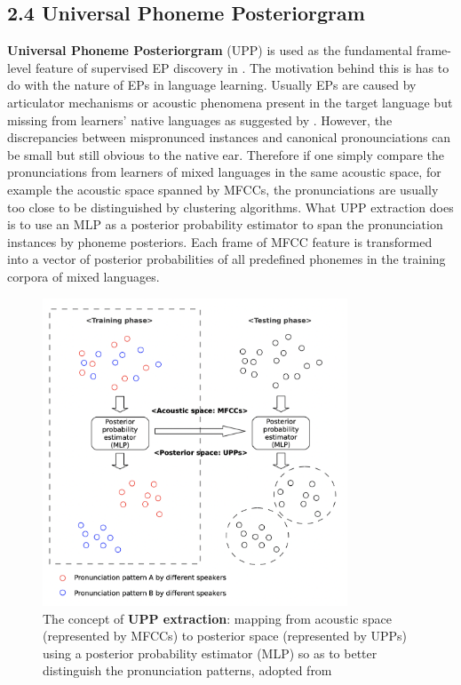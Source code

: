 \documentclass[nobib]{tufte-handout}
\begin{document}
\subsection{2.4 \textbf{Universal Phoneme Posteriorgram}}
\noindent \textbf{Universal Phoneme Posteriorgram} (UPP) is used as the fundamental frame-level feature of supervised EP discovery in \cite{wang2015supervised}. The motivation behind this is has to do with the nature of EPs in language learning. Usually EPs are caused by articulator mechanisms or acoustic phenomena present in the target language but missing from learners' native languages as suggested by \cite{wang2015supervised}. However, the discrepancies between mispronunced instances and canonical pronounciations can be small but still obvious to the native ear. Therefore if one simply compare the pronunciations from learners of mixed languages in the same acoustic space, for example the acoustic space spanned by MFCCs, the pronunciations are usually too close to be distinguished by clustering algorithms. What UPP extraction does is to use an MLP as a posterior probability estimator to span the pronunciation instances by phoneme posteriors. Each frame of MFCC feature is transformed into a vector of posterior probabilities of all predefined phonemes in the training corpora of mixed languages.
\begin{figure}[h!]
\centering
  \includegraphics[width=0.81\textwidth]{upp.png}
  \caption{The concept of \textbf{UPP extraction}: mapping from acoustic space (represented by MFCCs) to posterior space (represented by UPPs) using a posterior probability estimator (MLP) so as to better distinguish the pronunciation patterns, adopted from \cite{wang2015supervised}}
  \label{fig:upp}
\end{figure}
\end{document}
